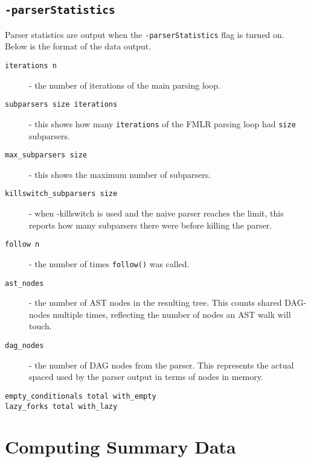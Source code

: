 \documentclass{report}
\begin{document}
\subsection*{\texttt{-parserStatistics}}

Parser statistics are output when the \verb"-parserStatistics" flag is
turned on.  Below is the format of the data output.

\begin{description}
\item[\texttt{iterations n}] - the number of iterations of the main parsing
  loop.
\item[\texttt{subparsers size iterations}] - this shows how many \verb"iterations"
  of the FMLR parsing loop had \verb"size" subparsers.
\item[\texttt{max\_subparsers size}] - this shows the maximum number of
  subparsers.
\item[\texttt{killswitch\_subparsers size}] - when -killswitch is used and
  the naive parser reaches the limit, this reports how many subparsers
  there were before killing the parser.
\item[\texttt{follow n}] - the number of times \verb"follow()" was called.
\item[\texttt{ast\_nodes}] - the number of AST nodes in the resulting tree.
  This counts shared DAG-nodes multiple times, reflecting the number
  of nodes an AST walk will touch.
\item[\texttt{dag\_nodes}] - the number of DAG nodes from the parser.  This
  represents the actual spaced used by the parser output in terms of
  nodes in memory.
\item[\texttt{empty\_conditionals total with\_empty}]
\item[\texttt{lazy\_forks total with\_lazy}]
\end{description}



\section{Computing Summary Data}
\end{document}
